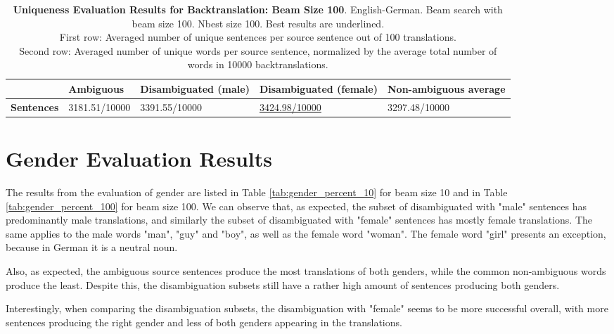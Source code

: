 \begin{table} 
    \label{tab:uniqueness_backtranslation_100}
    \begin{tabularx}{\linewidth}{|X|XXXX|}
        \hline
         & \textbf{Ambiguous} & \textbf{Disambiguated (male)} & \textbf{Disambiguated (female)} & \textbf{Non-ambiguous average} \\ \hline
         \textbf{Sentences} & 3181.51/10000 & 3391.55/10000 & \underline{3424.98/10000} & 3297.48/10000 \\ \hline
    \end{tabularx}
    \caption{\textbf{Uniqueness Evaluation Results for Backtranslation: Beam Size 100}. English-German. Beam search with beam size 100. Nbest size 100. Best results are underlined. \\ First row: Averaged number of unique sentences per source sentence out of 100 translations. \\ Second row: Averaged number of unique words per source sentence, normalized by the average total number of words in 10000 backtranslations.}
\end{table}

\section{Gender Evaluation Results}
\label{ch:Results:Gender}

The results from the evaluation of gender are listed in Table \ref{tab:gender_percent_10} for beam size 10 and in Table \ref{tab:gender_percent_100} for beam size 100. We can observe that, as expected, the subset of disambiguated with "male" sentences has predominantly male translations, and similarly the subset of disambiguated with "female" sentences has mostly female translations. The same applies to the male words "man", "guy" and "boy", as well as the female word "woman". The female word "girl" presents an exception, because in German it is a neutral noun.

Also, as expected, the ambiguous source sentences produce the most translations of both genders, while the common non-ambiguous words produce the least. Despite this, the disambiguation subsets still have a rather high amount of sentences producing both genders. 

Interestingly, when comparing the disambiguation subsets, the disambiguation with "female" seems to be more successful overall, with more sentences producing the right gender and less of both genders appearing in the translations.

